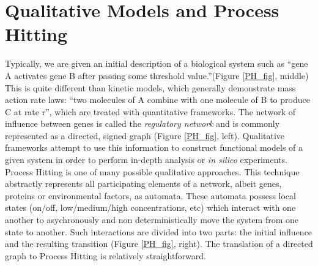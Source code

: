 \documentclass[en]{jdoc}
\begin{document}
  \section{Qualitative Models and Process Hitting}
  
  Typically, we are given an initial description of a biological system such as ``gene A activates gene B after passing some threshold value.''(Figure \ref{PH_fig}, middle) This is quite different than kinetic models, which generally demonstrate mass action rate laws: ``two molecules of A combine with one molecule of B to produce C at rate r'', which are treated with quantitative frameworks. The network of influence between genes is called the \textit{regulatory network} and is commonly represented as a directed, signed graph (Figure \ref{PH_fig}, left). Qualitative frameworks attempt to use this information to construct functional models of a given system in order to perform in-depth analysis or \textit{in silico} experiments. Process Hitting is one of many possible qualitative approaches. This technique abstractly represents all participating elements of a network, albeit genes, proteins or environmental factors, as automata. These automata possess local states (on/off, low/medium/high concentrations, etc) which interact with one another to asychronously and non deterministically move the system from one state to another. Such interactions are divided into two parts: the initial influence and the resulting transition (Figure \ref{PH_fig}, right). The translation of a directed graph to Process Hitting is relatively straightforward.
\end{document}
